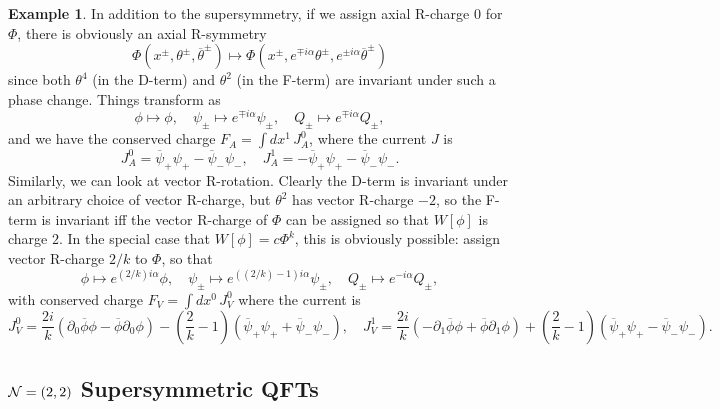 \documentclass{report}
\theoremstyle{plain}
\theoremstyle{definition}
\newtheorem{example}[theorem]{Example}
\theoremstyle{remark}
\newcommand{\di}{\partial}
\newcommand{\cnj}{\overline}
\begin{document}
\begin{example}
  In addition to the supersymmetry, if we assign axial R-charge $0$
  for $\Phi$, there is obviously an axial R-symmetry
  \[ \Phi(x^\pm, \theta^\pm, \cnj\theta^\pm) \mapsto \Phi(x^\pm, e^{\mp i\alpha} \theta^\pm, e^{\pm i\alpha} \cnj\theta^\pm) \]
  since both $\theta^4$ (in the D-term) and $\theta^2$ (in the F-term)
  are invariant under such a phase change. Things transform as
  \[ \phi \mapsto \phi, \quad \psi_\pm \mapsto e^{\mp i\alpha} \psi_\pm, \quad Q_\pm \mapsto e^{\mp i\alpha} Q_\pm, \]
  and we have the conserved charge $F_A = \int dx^1 \, J^0_A$, where
  the current $J$ is
  \[ J^0_A = \cnj\psi_+ \psi_+ - \cnj\psi_- \psi_-, \quad J^1_A = -\cnj\psi_+ \psi_+ - \cnj\psi_- \psi_-. \]
  Similarly, we can look at vector R-rotation. Clearly the D-term is
  invariant under an arbitrary choice of vector R-charge, but
  $\theta^2$ has vector R-charge $-2$, so the F-term is invariant iff
  the vector R-charge of $\Phi$ can be assigned so that $W[\phi]$ is
  charge $2$. In the special case that $W[\phi] = c\Phi^k$, this is
  obviously possible: assign vector R-charge $2/k$ to $\Phi$, so that
  \[ \phi \mapsto e^{(2/k)i\alpha}\phi, \quad \psi_\pm \mapsto e^{((2/k)-1)i\alpha} \psi_\pm, \quad Q_\pm \mapsto e^{-i\alpha} Q_\pm, \]
  with conserved charge $F_V = \int dx^0 \, J^0_V$ where the current
  is
  \[ J^0_V = \frac{2i}{k}(\di_0 \cnj\phi \phi - \cnj\phi \di_0\phi) - \left(\frac{2}{k}-1\right)(\cnj\psi_+ \psi_+ + \cnj\psi_- \psi_-), \quad J^1_V = \frac{2i}{k}(-\di_1 \cnj\phi \phi + \cnj\phi \di_1\phi) + \left(\frac{2}{k}-1\right)(\cnj\psi_+ \psi_+ - \cnj\psi_- \psi_-). \]
\end{example}

\subsection{\texorpdfstring{${\cal N} = (2,2)$}{N = (2,2)} Supersymmetric QFTs}
\end{document}
